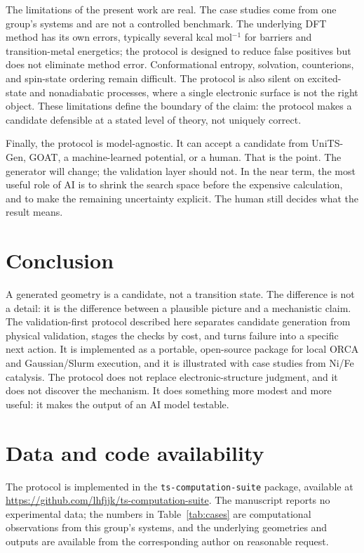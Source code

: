 \documentclass[11pt,a4paper]{article}
\begin{document}
The limitations of the present work are real. The case studies come from one group's systems and are not a controlled benchmark. The underlying DFT method has its own errors, typically several kcal mol$^{-1}$ for barriers and transition-metal energetics; the protocol is designed to reduce false positives but does not eliminate method error. Conformational entropy, solvation, counterions, and spin-state ordering remain difficult. The protocol is also silent on excited-state and nonadiabatic processes, where a single electronic surface is not the right object. These limitations define the boundary of the claim: the protocol makes a candidate defensible at a stated level of theory, not uniquely correct.

Finally, the protocol is model-agnostic. It can accept a candidate from UniTS-Gen, GOAT, a machine-learned potential, or a human. That is the point. The generator will change; the validation layer should not. In the near term, the most useful role of AI is to shrink the search space before the expensive calculation, and to make the remaining uncertainty explicit. The human still decides what the result means.

\section{Conclusion}

A generated geometry is a candidate, not a transition state. The difference is not a detail: it is the difference between a plausible picture and a mechanistic claim. The validation-first protocol described here separates candidate generation from physical validation, stages the checks by cost, and turns failure into a specific next action. It is implemented as a portable, open-source package for local ORCA and Gaussian/Slurm execution, and it is illustrated with case studies from Ni/Fe catalysis. The protocol does not replace electronic-structure judgment, and it does not discover the mechanism. It does something more modest and more useful: it makes the output of an AI model testable.

\section*{Data and code availability}

The protocol is implemented in the \texttt{ts-computation-suite} package, available at \url{https://github.com/lhfjjk/ts-computation-suite}. The manuscript reports no experimental data; the numbers in Table~\ref{tab:cases} are computational observations from this group's systems, and the underlying geometries and outputs are available from the corresponding author on reasonable request.
\end{document}
